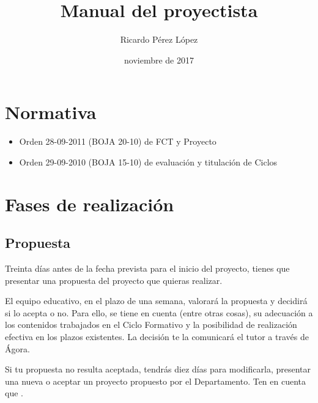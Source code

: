 \documentclass[a4paper,12pt,spanish]{sphinxmanual}
\title{Manual del proyectista}
\date{noviembre de 2017}
\author{Ricardo Pérez López}
\begin{document}
\maketitle
\sphinxtableofcontents
{}\label{\detokenize{index_latex::doc}}



\chapter{Normativa}
\label{\detokenize{normativa:manual-del-proyectista}}\label{\detokenize{normativa:normativa}}\label{\detokenize{normativa::doc}}\begin{itemize}
\item {} 
Orden 28-09-2011 (BOJA 20-10) de FCT y Proyecto

\item {} 
Orden 29-09-2010 (BOJA 15-10) de evaluación y titulación de Ciclos

\end{itemize}


\chapter{Fases de realización}
\label{\detokenize{fases-de-realizacion:fases-de-realizacion}}\label{\detokenize{fases-de-realizacion::doc}}

\section{Propuesta}
\label{\detokenize{fases-de-realizacion:propuesta}}
Treinta días antes de la fecha prevista para el inicio del proyecto, tienes que presentar una propuesta del proyecto que quieras realizar.

El equipo educativo, en el plazo de una semana, valorará la propuesta y decidirá si lo acepta o no. Para ello, se tiene en cuenta (entre otras cosas), su adecuación a los contenidos trabajados en el Ciclo Formativo y la posibilidad de realización efectiva en los plazos existentes. La decisión te la comunicará el tutor a través de Ágora.

Si tu propuesta no resulta aceptada, tendrás diez días para modificarla, presentar una nueva o aceptar un proyecto propuesto por el Departamento. Ten en cuenta que .
\end{document}
